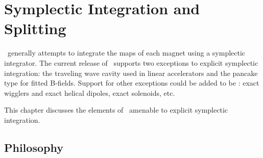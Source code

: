 
\chapter{Symplectic Integration and Splitting}
\label{cha:symplectic.integ}

%
\PTC\ generally attempts to integrate the maps of each magnet using a
symplectic integrator. The current release of \PTC\ supports two exceptions
to explicit symplectic integration: the traveling wave cavity used in linear
accelerators and the pancake type  for fitted B-fields. Support for other
exceptions could be added to be \PTC: exact wigglers and exact helical
dipoles, exact solenoids, etc.

This chapter discusses the elements of \PTC\ amenable to explicit
symplectic integration.


\section{Philosophy}
\label{sec:talman.phil}

